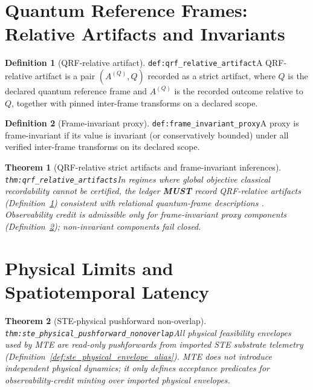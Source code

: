 \documentclass[11pt]{article}
\theoremstyle{definition}
\newtheorem{definition}{Definition}
\theoremstyle{plain}
\newtheorem{theorem}{Theorem}
\newcommand{\MUST}{\textbf{MUST}}
\newcommand{\STE}{\textsf{STE}}
\newcommand{\MTE}{\textsf{MTE}}
\newcommand{\lbl}[1]{\texttt{\footnotesize\nolinkurl{#1}}}
\newcommand{\DefLabel}[1]{\hfill{\small\lbl{#1}}}
\begin{document}
\section{Quantum Reference Frames: Relative Artifacts and Invariants}\label{sec:quantum}
\begin{definition}[QRF-relative artifact]\DefLabel{def:qrf_relative_artifact}\label{def:qrf_relative_artifact}
A QRF-relative artifact is a pair $(A^{(Q)},Q)$ recorded as a strict artifact, where $Q$ is the declared quantum reference frame and $A^{(Q)}$ is the recorded outcome relative to $Q$, together with pinned inter-frame transforms on a declared scope.
\end{definition}

\begin{definition}[Frame-invariant proxy]\DefLabel{def:frame_invariant_proxy}\label{def:frame_invariant_proxy}
A proxy is frame-invariant if its value is invariant (or conservatively bounded) under all verified inter-frame transforms on its declared scope.
\end{definition}

\begin{theorem}[QRF-relative strict artifacts and frame-invariant inferences]\DefLabel{thm:qrf_relative_artifacts}\label{thm:qrf_relative_artifacts}
In regimes where global objective classical recordability cannot be certified, the ledger \MUST{} record QRF-relative artifacts (Definition~\ref{def:qrf_relative_artifact}) consistent with relational quantum-frame descriptions \cite{Giacomini2019QRF}.
Observability credit is admissible only for frame-invariant proxy components (Definition~\ref{def:frame_invariant_proxy}); non-invariant components fail closed.
\end{theorem}

\section{Physical Limits and Spatiotemporal Latency}\label{sec:physics}
\begin{theorem}[STE-physical pushforward non-overlap]\DefLabel{thm:ste_physical_pushforward_nonoverlap}\label{thm:ste_physical_pushforward_nonoverlap}
All physical feasibility envelopes used by \MTE{} are read-only pushforwards from imported \STE{} substrate telemetry (Definition~\ref{def:ste_physical_envelope_alias}).
\MTE{} does not introduce independent physical dynamics; it only defines acceptance predicates for observability-credit minting over imported physical envelopes.
\end{theorem}
\end{document}
